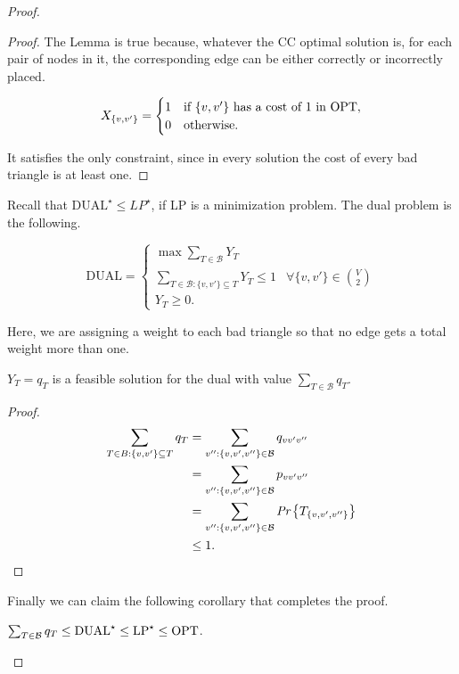 \begin{proof}
	\begin{proof}
		 The Lemma is true because, whatever the CC optimal solution is, for each pair of nodes in it, the corresponding edge can be either correctly or incorrectly placed.
		 	
		\begin{equation}
		X_{\{v, v'\}} = \begin{cases}
		1 & \text{if $\{v, v'\}$ has a cost of 1 in } \text{OPT},\\
		0 & \text{otherwise.}
		\end{cases}
		\end{equation}
		
		It satisfies the only constraint, since in every solution the cost of every bad triangle is at least one.
	\end{proof}

	Recall that $\text{DUAL}^\star \leq LP^\star$, if LP is a minimization problem. The dual problem is the following.
	
	\begin{equation} \text{DUAL} =
	\begin{cases}
	\max \sum_{T \in \mathcal{B}} Y_T\\
	\sum_{T \in \mathcal{B} : 	\{v, v'\} \subseteq T} Y_T \leq 1 & \forall \{v, v'\} \in \binom{V}{2}\\
	Y_T \geq 0.
	\end{cases}
	\end{equation}
	
	Here, we are assigning a weight to each bad triangle so that no edge gets a total weight more than one. 
	\begin{thm}
		$Y_T = q_T$ is a feasible solution for the dual with value $\sum_{T \in \mathcal{B}} q_T$.
	\end{thm}

	\begin{proof}
		
		\begin{align}
		\sum_{T \in B : \{v,v'\} \subseteq T} q_T &= \sum_{v'': \{v,v',v''\} \in \mathcal{B}}q_{vv'v''}\\
		&=\sum_{v'':\{v,v',v''\} \in \mathcal{B}} p_{vv'v''} \\
		&=\sum_{v'':\{v,v',v''\} \in \mathcal{B}} \emph{Pr}\left\{T_{\{v,v',v''\}}\right\}\\
		& \leq 1.
		\end{align}
	\end{proof}

Finally we can claim the following corollary that completes the proof.
		\begin{cor}
			$\sum_{T \in \mathcal{B}} q_T \leq \text{DUAL}^\star \leq \text{LP}^\star \leq \text{OPT}$.
		\end{cor}
	\end{proof}
